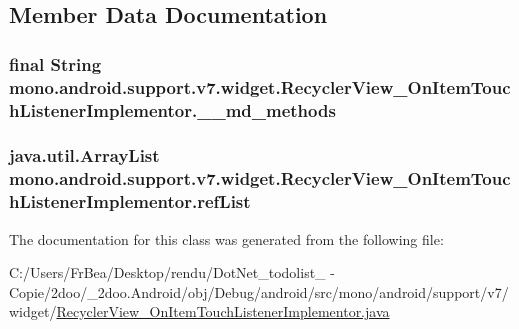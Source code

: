 \subsection{Member Data Documentation}
\hypertarget{classmono_1_1android_1_1support_1_1v7_1_1widget_1_1_recycler_view___on_item_touch_listener_implementor_f3805010ccf5976fd0ef488ea4cc6ae7}{
\subsubsection[{\_\-\_\-md\_\-methods}]{\setlength{\rightskip}{0pt plus 5cm}final String {\bf mono.android.support.v7.widget.RecyclerView\_\-OnItemTouchListenerImplementor.\_\-\_\-md\_\-methods}}}
\label{classmono_1_1android_1_1support_1_1v7_1_1widget_1_1_recycler_view___on_item_touch_listener_implementor_f3805010ccf5976fd0ef488ea4cc6ae7}


\hypertarget{classmono_1_1android_1_1support_1_1v7_1_1widget_1_1_recycler_view___on_item_touch_listener_implementor_a7b92ddf820b4454d028422af7961637}{
\subsubsection[{refList}]{\setlength{\rightskip}{0pt plus 5cm}java.util.ArrayList {\bf mono.android.support.v7.widget.RecyclerView\_\-OnItemTouchListenerImplementor.refList}}}
\label{classmono_1_1android_1_1support_1_1v7_1_1widget_1_1_recycler_view___on_item_touch_listener_implementor_a7b92ddf820b4454d028422af7961637}




The documentation for this class was generated from the following file:\begin{CompactItemize}
\item 
C:/Users/FrBea/Desktop/rendu/DotNet\_\-todolist\_ - Copie/2doo/\_\-2doo.Android/obj/Debug/android/src/mono/android/support/v7/widget/\hyperlink{_recycler_view___on_item_touch_listener_implementor_8java}{RecyclerView\_\-OnItemTouchListenerImplementor.java}\end{CompactItemize}
